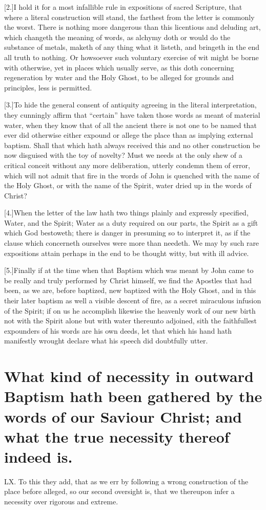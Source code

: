 [2.]I hold it for a most infallible rule in expositions of sacred Scripture, that where a literal construction will stand, the farthest from the letter is commonly the worst. There is nothing more dangerous than this licentious and deluding art, which changeth the meaning of words, as alchymy doth or would do the substance of metals, maketh of any thing what it listeth, and bringeth in the end all truth to nothing. Or howsoever such voluntary exercise of wit might be borne with otherwise, yet in places which usually serve, as this doth concerning regeneration by water and the Holy Ghost, to be alleged for grounds and principles, less is permitted.

[3.]To hide the general consent of antiquity agreeing in the literal interpretation, they cunningly affirm that “certain” have taken those words as meant of material water, when they know that of all the ancient there is not one to be named that ever did otherwise either expound or allege the place than as implying external baptism. Shall that which hath always received this and no other construction be now disguised with the toy of novelty? Must we needs at the only shew of a critical conceit without any more deliberation, utterly condemn them of error, which will not admit that fire in the words of John is quenched with the name of the Holy Ghost, or with the name of the Spirit, water dried up in the words of Christ?

[4.]When the letter of the law hath two things plainly and expressly specified, Water, and the Spirit; Water as a duty  required on our parts, the Spirit as a gift which God bestoweth; there is danger in presuming so to interpret it, as if the clause which concerneth ourselves were more than needeth.
 We may by such rare expositions attain perhaps in the end to be thought witty, but with ill advice.

[5.]Finally if at the time when that Baptism which was meant by John came to be really and truly performed by Christ himself, we find the Apostles that had been, as we are, before baptized, new baptized with the Holy Ghost, and in this their later baptism as well a visible descent of fire, as a secret miraculous infusion of the Spirit; if on us he accomplish likewise the heavenly work of our new birth not with the Spirit alone but with water thereunto adjoined, sith the faithfullest expounders of his words are his own deeds, let that which his hand hath manifestly wrought declare what his speech did doubtfully utter.


\section*{What kind of necessity in outward Baptism hath been gathered by the words of our Saviour Christ; and what the true necessity thereof indeed is.}
LX. To this they add, that as we err by following a wrong construction of the place before alleged, so our second oversight is, that we thereupon infer a necessity over rigorous and extreme.


